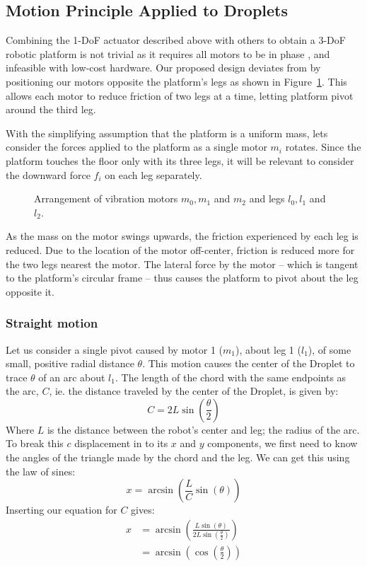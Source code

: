 \documentclass[letterpaper, 10pt, conference]{ieeeconf}
\begin{document}
\subsection{Motion Principle Applied to Droplets}
Combining the 1-DoF actuator described above with others to obtain a 3-DoF robotic platform is not trivial as it requires all motors to be in phase \cite{Vartholomeos2005}, and infeasible with low-cost hardware. Our proposed design deviates from \cite{Vartholomeos2005} by positioning our motors opposite the platform's legs as shown in Figure~\ref{dropletMotorDiagram}. This allows each motor to reduce friction of two legs at a time, letting platform pivot around the third leg. 

With the simplifying assumption that the platform is a uniform mass, lets consider the forces applied to the platform as a single motor $m_i$ rotates. Since the platform touches the floor only with its three legs, it will be relevant to consider the downward force $f_i$ on each leg separately.

\begin{figure}
\centering

\caption{Arrangement of vibration motors $m_0, m_1$ and $m_2$ and legs $l_0, l_1$ and $l_2$.}
\label{dropletMotorDiagram}
\end{figure}

As the mass on the motor swings upwards, the friction experienced by each leg is reduced. Due to the location of the motor off-center, friction is reduced more for the two legs nearest the motor. The lateral force by the motor -- which is tangent to the platform's circular frame -- thus causes the platform to pivot about the leg opposite it.



\subsubsection{Straight motion}

Let us consider a single pivot caused by motor 1 ($m_1$), about leg 1 ($l_1$), of some small, positive radial distance $\theta$. This motion causes the center of the Droplet to trace $\theta$ of an arc about $l_1$. The length of the chord with the same endpoints as the arc, $C$, ie. the distance traveled by the center of the Droplet, is given by:
\begin{equation}
C=2 L \sin\left(\frac{\theta}{2}\right)
\end{equation}
Where $L$ is the distance between the robot's center and leg; the radius of the arc. To break this $c$ displacement in to its $x$ and $y$ components, we first need to know the angles of the triangle made by the chord and the leg. We can get this using the law of sines:
\begin{equation}
x = \arcsin\left(\frac{L}{C}\sin(\theta)\right) 
\end{equation}
Inserting our equation for $C$ gives:
\begin{align}
x &=\arcsin\left(\frac{L\sin(\theta)}{2 L \sin(\frac{\theta}{2})}\right) \\
\nonumber
   &=\arcsin\left(\cos\left(\frac{\theta}{2}\right)\right)
\end{align}
\end{document}
